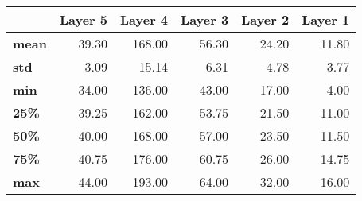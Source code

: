 \begin{tabular}{lrrrrr}
\toprule
{} &  Layer 5 &  Layer 4 &  Layer 3 &  Layer 2 &  Layer 1 \\
\midrule
\textbf{mean} &    39.30 &   168.00 &    56.30 &    24.20 &    11.80 \\
\textbf{std } &     3.09 &    15.14 &     6.31 &     4.78 &     3.77 \\
\textbf{min } &    34.00 &   136.00 &    43.00 &    17.00 &     4.00 \\
\textbf{25\% } &    39.25 &   162.00 &    53.75 &    21.50 &    11.00 \\
\textbf{50\% } &    40.00 &   168.00 &    57.00 &    23.50 &    11.50 \\
\textbf{75\% } &    40.75 &   176.00 &    60.75 &    26.00 &    14.75 \\
\textbf{max } &    44.00 &   193.00 &    64.00 &    32.00 &    16.00 \\
\bottomrule
\end{tabular}
